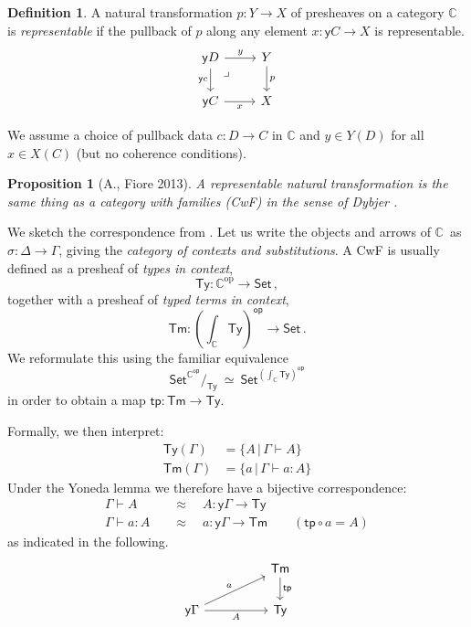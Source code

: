 \documentclass[12pt,reqno]{amsart}
\newcommand{\C}{\ensuremath{\mathbb{C}}}
\newcommand{\op}[1]{\ensuremath{{#1}^{\mathsf{op}}}}
\newcommand{\pshx}[1]{\ensuremath{\mathsf{Set}^{\op{#1}}}}
\newcommand{\Set}{\ensuremath{\mathsf{Set}}}
\newcommand{\y}{\ensuremath{\mathsf{y}}} %
\newcommand{\tp}{\ensuremath{\mathsf{tp}}}
\newcommand{\Tm}{\ensuremath{\mathsf{Tm}}}
\newcommand{\Ty}{\ensuremath{\mathsf{Ty}}}
\renewcommand{\to}{\ensuremath{\rightarrow}}
\newcommand{\terms}[2]{#1 \vdash #2}
\newcommand{\Gterms}[1]{\terms{\Gamma}{#1}}
\newcommand{\pbcorner}{\arrow[dr,phantom,"\lrcorner" very near start, shift right=.5ex]} %
\newtheorem{proposition}[theorem]{Proposition}
\theoremstyle{remark}
\theoremstyle{definition}
\newtheorem{definition}[theorem]{Definition}
\begin{document}
\begin{definition}\label{def:representablenattrans} A natural transformation $p : Y \to X$ of presheaves on a category $\C$  is \emph{representable} if the pullback of $p$ along any element $x: \y{C} \to X$ is representable.
\begin{equation*}
\begin{tikzcd}
 \y{D} \ar[d,swap,"{\y{c}}"] \ar[r,"y"] \pbcorner &  Y \ar[d, "p"]\\
\y{C} \ar[r,swap,"x"]  & X
\end{tikzcd}
\end{equation*}
\end{definition}
We assume a choice of pullback data $c : D \to C$ in $\C$ and $y \in Y(D)$ for all $x\in X(C)$ (but no coherence conditions).

\begin{proposition}[A., Fiore 2013] A representable natural transformation is the same thing as a \emph{category with families (CwF)} in the sense of Dybjer \cite{Dybjer:CWF}.
\end{proposition}

We sketch the correspondence from \cite{awodey:NM}.
Let us write the objects and arrows of \C\ as $\sigma : \Delta \to \Gamma$, giving the \emph{category of contexts and substitutions}.
A CwF is usually defined as a presheaf of \emph{types in context}, 
\[
\Ty : \C^{\mathrm{op}}\to \Set\,,
\]
together with a presheaf of \emph{typed terms in context}, 
\[
\Tm : {\textstyle (\int_{\C}\!\Ty)^{\mathsf{op}}\to \Set }\,.
\]
We reformulate this using the familiar equivalence
\[\textstyle
 \pshx{\C}\!/_{\Ty}\ \simeq\ \pshx{(\int_{\C}\Ty)}
\]
in order to obtain a map $\tp :\Tm \to \Ty$.


Formally, we then interpret:
\begin{align*}
 \Ty(\Gamma) &= \{ A \,|\, \Gamma \vdash A\} \\
 \Tm(\Gamma) &= \{ a \,|\, \Gamma \vdash a:A\} 
\end{align*}
Under the Yoneda lemma we therefore have a bijective correspondence:
\begin{align*}
\Gamma\vdash A\quad &\approx\quad A : \y{\Gamma}\to \Ty  \\
\Gterms{a:A}\quad &\approx\quad  a: \y{\Gamma}\to \Tm  \qquad (\tp\circ a = A)
\end{align*}
as indicated in the following.
\[
\begin{tikzcd}
 	&&  {\Tm} \ar[d,"{\tp}"]\\
\y\Gamma \ar[rru, "a"]   \ar[rr ,swap,  "A"]   && {\Ty}
\end{tikzcd}
\]
%
\end{document}
